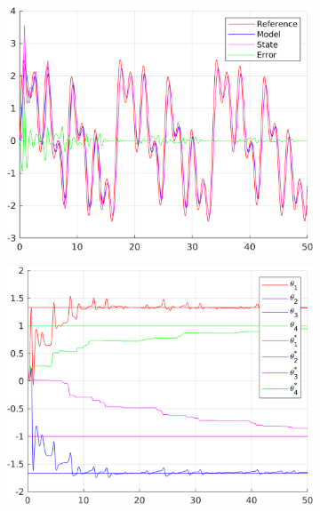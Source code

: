 \documentclass[12pt,a4paper]{article}
\begin{document}
	\begin{figure}[H]
		\centering
		\begin{subfigure}{.45\textwidth}
			\centering
			\includegraphics[width=1\textwidth]{Graphics/NonLinearStateZero3.png}
		\end{subfigure}%
		\begin{subfigure}{.45\textwidth}
			\centering
			\includegraphics[width=1\textwidth]{Graphics/NonLinearParametersZero3.png}
		\end{subfigure}
		\begin{subfigure}{.45\textwidth}
			\centering

\end{subfigure}
\end{figure}
\end{document}

